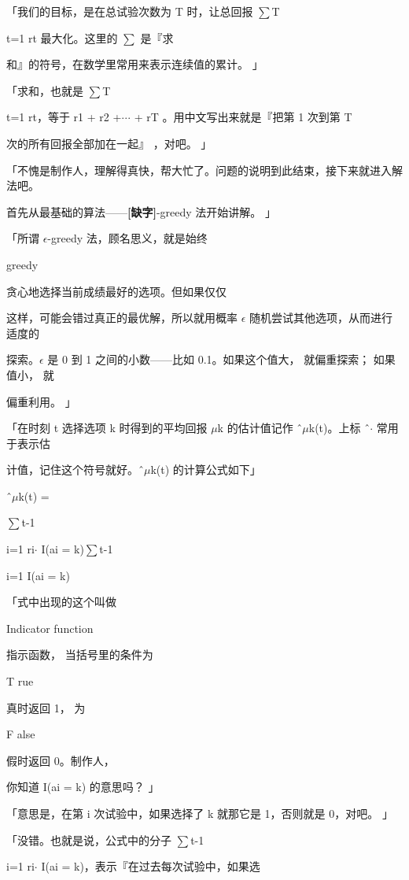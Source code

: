 「我们的目标，是在总试验次数为 T 时，让总回报 $\sum$T\par
t=1 rt 最大化。这里的 $\sum$ 是『求\par
和』的符号，在数学里常用来表示连续值的累计。 」\par
「求和，也就是 $\sum$T\par
t=1 rt，等于 r1 + r2 +$\cdot$$\cdot$$\cdot$ + rT 。用中文写出来就是『把第 1 次到第 T\par
次的所有回报全部加在一起』 ，对吧。 」\par
「不愧是制作人，理解得真快，帮大忙了。问题的说明到此结束，接下来就进入解法吧。\par
首先从最基础的算法——\textbf{[缺字]}-greedy 法开始讲解。 」\par
「所谓 $\epsilon$-greedy 法，顾名思义，就是始终\par
greedy\par
贪心地选择当前成绩最好的选项。但如果仅仅\par
这样，可能会错过真正的最优解，所以就用概率 $\epsilon$ 随机尝试其他选项，从而进行适度的\par
探索。$\epsilon$ 是 0 到 1 之间的小数——比如 0.1。如果这个值大， 就偏重探索； 如果值小， 就\par
偏重利用。 」\par
「在时刻 t 选择选项 k 时得到的平均回报 $\mu$k 的估计值记作 ˆ$\mu$k(t)。上标 ˆ$\cdot$ 常用于表示估\par
计值，记住这个符号就好。ˆ$\mu$k(t) 的计算公式如下」\par
ˆ$\mu$k(t) =\par
$\sum$t-1\par
i=1 ri$\cdot$ I(ai = k)$\sum$t-1\par
i=1 I(ai = k)\par
「式中出现的这个叫做\par
Indicator function\par
指示函数， 当括号里的条件为\par
T rue\par
真时返回 1， 为\par
F alse\par
假时返回 0。制作人，\par
你知道 I(ai = k) 的意思吗？ 」\par
「意思是，在第 i 次试验中，如果选择了 k 就那它是 1，否则就是 0，对吧。 」\par
「没错。也就是说，公式中的分子 $\sum$t-1\par
i=1 ri$\cdot$ I(ai = k)，表示『在过去每次试验中，如果选\par
